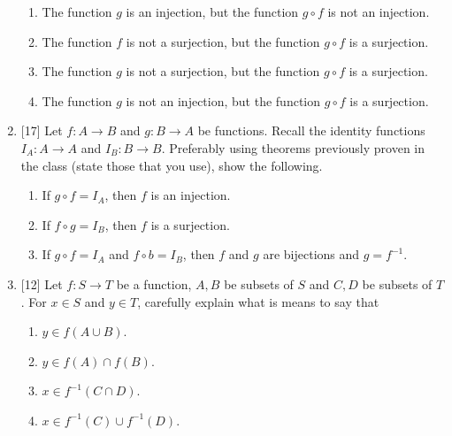 \documentclass[12pt]{article}
\begin{document}
\begin{enumerate}
\begin{enumerate}
  \item The function $g$ is an injection, but the function $g\circ f$ is not an injection.

  \item The function $f$ is not a surjection, but the function $g\circ f$ is a surjection.

  \item The function $g$ is not a surjection, but the function $g\circ f$ is a surjection.

  \item The function $g$ is not an injection, but the function $g\circ f$ is a surjection.

 \end{enumerate}  



\item{[17]}   Let $f\colon A\to B$ and $g\colon B\to A$ be functions.
            Recall the identity functions  $I_A\colon A\to A$ and  $I_B\colon B\to B$.
        Preferably using theorems previously proven in the class (state those that you use), show the following.

 \begin{enumerate}
  \item If $g\circ f=I_A$, then $f$ is an injection.
  \item If $f\circ g=I_B$, then $f$ is a surjection.
  \item If $g\circ f=I_A$ and $f\circ b=I_B$, then $f$ and $g$ are bijections and $g=f^{-1}$.
 \end{enumerate}  



\item{[12]} Let $f\colon S\to T$ be a function, $A,B$ be subsets of $S$ and $C,D$ be subsets of $T$.
  For $x\in S$ and $y\in T$, carefully explain what is means to say that 
  
 \begin{enumerate}
  \item $y\in f(A\cup B)$.
  \item $y\in f(A)\cap f(B)$.
  \item $x\in f^{-1}(C\cap D)$.
  \item $x\in f^{-1}(C) \cup f^{-1}(D)$.
 \end{enumerate}  


\end{enumerate}
\end{document}
